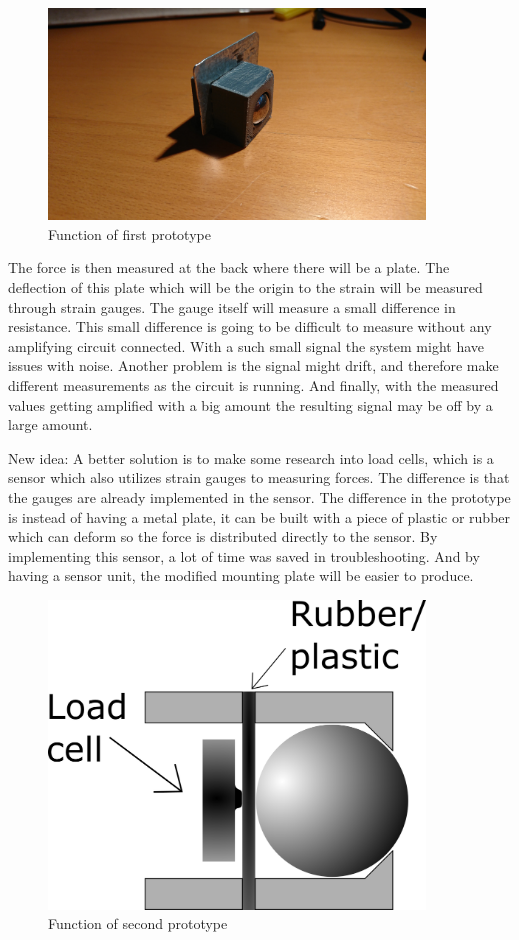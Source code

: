 \begin{figure}[H]
\begin{center}
	\includegraphics[width = 10cm]{Figures/Press_sens_prot_1.png}
	\caption{Function of first prototype}
	\label{Press_sens_prot_1}
\end{center}
\end{figure}
 The force is then measured at the back where there will be a plate. The deflection of this plate which will be the origin to the strain will be measured through strain gauges. 
The gauge itself will measure a small difference in resistance. This small difference is going to be difficult to measure without any amplifying circuit connected. With a such small signal the system might have issues with noise. Another problem is the signal might drift, and therefore make different measurements as the circuit is running. And finally, with the measured values getting amplified with a big amount the resulting signal may be off by a large amount. 

New idea:
A better solution is to make some research into load cells, which is a sensor which also utilizes strain gauges to measuring forces. The difference is that the gauges are already implemented in the sensor. The difference in the prototype is instead of having a metal plate, it can be built with a piece of plastic or rubber which can deform so the force is distributed directly to the sensor. By implementing this sensor, a lot of time was saved in troubleshooting. And by having a sensor unit, the modified mounting plate will be easier to produce. 
 
\begin{figure}[H]
\begin{center}
	\includegraphics[width = 10cm]{Figures/Press_sens_func_2.png}
	\caption{Function of second prototype}
	\label{Press_sens_prot_2}
\end{center}
\end{figure}

